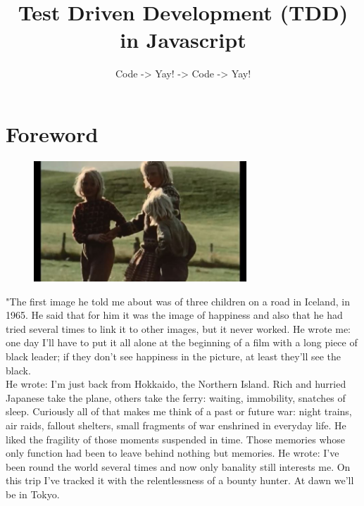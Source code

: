 \documentclass{42-en}
\begin{document}
                           \title{Test Driven Development (TDD) in Javascript}
                          \subtitle{Code -> Yay! -> Code -> Yay!}


\maketitle

\tableofcontents


\chapter{Foreword}

    \begin{figure}[H]
        \begin{center}
            \includegraphics[width=8cm]{sans_soleil.jpg}
        \end{center}
    \end{figure}
    "The first image he told me about was of three children on a road in Iceland, in 1965. He said that for him it was the image of happiness and also that he had tried several times to link it to other images, but it never worked. He wrote me: one day I'll have to put it all alone at the beginning of a film with a long piece of black leader; if they don't see happiness in the picture, at least they'll see the black. \\
    
    
    He wrote: I'm just back from Hokkaido, the Northern Island. Rich and hurried Japanese take the plane, others take the ferry: waiting, immobility, snatches of sleep. Curiously all of that makes me think of a past or future war: night trains, air raids, fallout shelters, small fragments of war enshrined in everyday life. He liked the fragility of those moments suspended in time. Those memories whose only function had been to leave behind nothing but memories. He wrote: I've been round the world several times and now only banality still interests me. On this trip I've tracked it with the relentlessness of a bounty hunter. At dawn we'll be in Tokyo.\\
    
\end{document}
